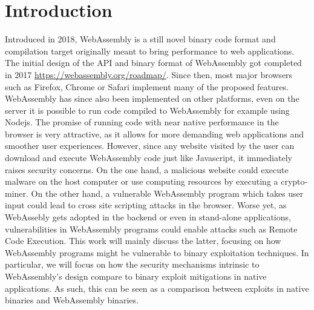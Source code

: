 \documentclass[sigconf]{acmart}
\begin{document}



\maketitle

\section{Introduction}
Introduced in 2018, WebAssembly is a still novel binary code format and compilation target originally meant to bring performance to web applications. The initial design of the API and binary format of WebAssembly got completed in 2017 \url{https://webassembly.org/roadmap/}. Since then, most major browsers such as Firefox, Chrome or Safari implement many of the proposed features. WebAssembly has since also been implemented on other platforms, even on the server it is possible to run code compiled to WebAssembly for example using Nodejs. The promise of running code with near native performance in the browser is very attractive, as it allows for more demanding web applications and smoother user experiences. However, since any website visited by the user can download and execute WebAssembly code just like Javascript, it immediately raises security concerns. On the one hand, a malicious website could execute malware on the host computer or use computing resources by executing a crypto-miner. On the other hand, a vulnerable WebAssembly program which takes user input could lead to cross site scripting attacks in the browser. Worse yet, as WebAssebly gets adopted in the backend or even in stand-alone applications, vulnerabilities in WebAssembly programs could enable attacks such as Remote Code Execution. This work will mainly discuss the latter, focusing on how WebAssembly programs might be vulnerable to binary exploitation techniques. In particular, we will focus on how the security mechanisms intrinsic to WebAssembly's design compare to binary exploit mitigations in native applications. As such, this can be seen as a comparison between exploits in native binaries and WebAssembly binaries.
\end{document}

